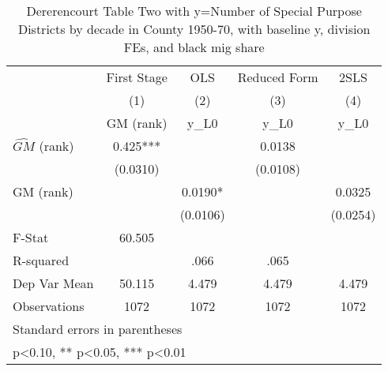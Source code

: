 \begin{table}[htbp]\centering
\def\sym#1{\ifmmode^{#1}\else\(^{#1}\)\fi}
\caption{Dererencourt Table Two with y=Number of Special Purpose Districts by decade in County 1950-70, with baseline y, division FEs, and black mig share}
\begin{tabular}{l*{4}{c}}
\toprule
                    & First Stage   &         OLS   &Reduced Form   &        2SLS   \\
                    &\multicolumn{1}{c}{(1)}&\multicolumn{1}{c}{(2)}&\multicolumn{1}{c}{(3)}&\multicolumn{1}{c}{(4)}\\
                    &\multicolumn{1}{c}{GM  (rank)}&\multicolumn{1}{c}{y\_L0}&\multicolumn{1}{c}{y\_L0}&\multicolumn{1}{c}{y\_L0}\\
\midrule
$\hat{GM}$ (rank)   &       0.425***&               &      0.0138   &               \\
                    &    (0.0310)   &               &    (0.0108)   &               \\
\addlinespace
GM  (rank)          &               &      0.0190*  &               &      0.0325   \\
                    &               &    (0.0106)   &               &    (0.0254)   \\
\midrule
F-Stat              &      60.505   &               &               &               \\
R-squared           &               &        .066   &        .065   &               \\
Dep Var Mean        &      50.115   &       4.479   &       4.479   &       4.479   \\
Observations        &        1072   &        1072   &        1072   &        1072   \\
\bottomrule
\multicolumn{5}{l}{\footnotesize Standard errors in parentheses}\\
\multicolumn{5}{l}{\footnotesize * p<0.10, ** p<0.05, *** p<0.01}\\
\end{tabular}
\end{table}
